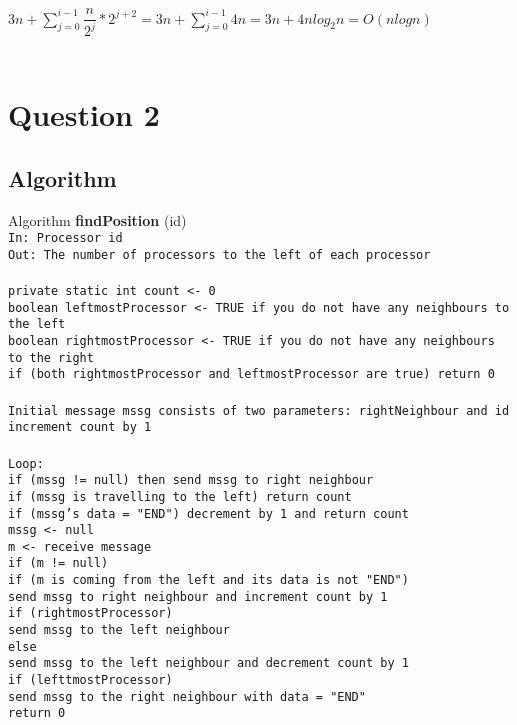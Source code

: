 \documentclass[12pt,letterpaper]{article}
\begin{document}
$3n + \sum_{j = 0}^{i - 1} \dfrac{n}{2^{j}}*2^{j+2} = 3n + \sum_{j = 0}^{i - 1} 4n = 3n + 4n log_{2}n = O(nlogn)$ \\ \\

\newpage
\section*{Question 2}
\subsection* {Algorithm}
Algorithm \textbf{findPosition} (id)\\
\texttt {In: Processor id\\
\texttt Out: The number of processors to the left of each processor\\ \\
\texttt private static int count <- 0 \\
\texttt boolean leftmostProcessor <- TRUE if you do not have any neighbours to the left \\
\texttt boolean rightmostProcessor <- TRUE if you do not have any neighbours to the right \\
\texttt if (both rightmostProcessor and leftmostProcessor are true) return 0 \\ \\
\texttt Initial message mssg consists of two parameters: rightNeighbour and id \\
\texttt increment count by 1\\ \\
\texttt Loop:\\
\texttt if (mssg != null) then send mssg to right neighbour \\ 
\hphantom{~~~~}if (mssg is travelling to the left) return count \\
\hphantom{~~~~}if (mssg's data = "END") decrement by 1 and return count \\
\texttt mssg <- null \\
\texttt m <- receive message \\
\texttt if (m != null) \\
\hphantom{~~~~} if (m is coming from the left and its data is not "END") \\
\hphantom{~~~~~~~~} send mssg to right neighbour and increment count by 1\\
\hphantom{~~~~~~~~}if (rightmostProcessor)\\
\hphantom{~~~~~~~~~~~~}send mssg to the left neighbour\\
\hphantom{~~~~}else \\
\hphantom{~~~~~~~~}send mssg to the left neighbour and decrement count by 1\\
\hphantom{~~~~~~~~}if (lefttmostProcessor)\\
\hphantom{~~~~~~~~~~~~}send mssg to the right neighbour with data = "END"\\
\texttt return 0} \\
\end{document}
